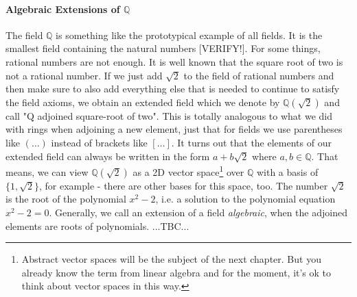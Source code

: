






\paragraph{Algebraic Extensions of $\mathbb{Q}$}
The field $\mathbb{Q}$ is something like the prototypical example of all fields. It is the smallest field containing the natural numbers [VERIFY!]. For some things, rational numbers are not enough. It is well known that the square root of two is not a rational number. If we just add $\sqrt{2}$ to the field of rational numbers and then make sure to also add everything else that is needed to continue to satisfy the field axioms, we obtain an extended field which we denote by $\mathbb{Q}(\sqrt{2})$ and call "Q adjoined square-root of two". This is totally analogous to what we did with rings when adjoining a new element, just that for fields we use parentheses like $(\ldots)$ instead of brackets like $[\ldots]$. It turns out that the elements of our extended field can always be written in the form $a + b \sqrt{2}$ where $a,b \in \mathbb{Q}$. That means, we can view $\mathbb{Q}(\sqrt{2})$ as a 2D vector space\footnote{Abstract vector spaces will be the subject of the next chapter. But you already know the term from linear algebra and for the moment, it's ok to think about vector spaces in this way.} over $\mathbb{Q}$ with a basis of $\{1, \sqrt{2}\}$, for example - there are other bases for this space, too. The number $\sqrt{2}$ is the root of the polynomial $x^2 - 2$, i.e. a solution to the polynomial equation $x^2 - 2 = 0$. Generally, we call an extension of a field \emph{algebraic}, when the adjoined elements are roots of polynomials. ...TBC...

